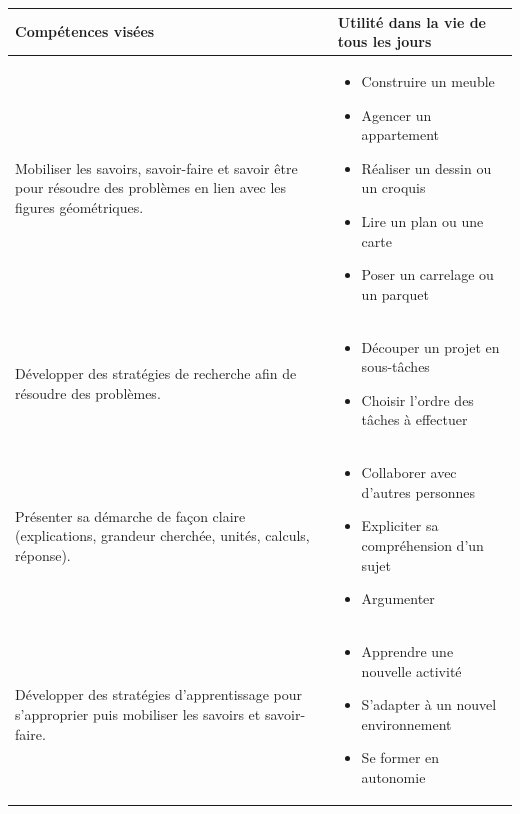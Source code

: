 \def\arraystretch{1.6}
\begin{tabularx}{\textwidth}{|>{\raggedright\arraybackslash}X|>{\raggedright\arraybackslash}X|}
\hline
\cellcolor{themeColor!30}Compétences visées & \cellcolor{themeColor!30}Utilité dans la vie de tous les jours \\
\hline
Mobiliser les savoirs, savoir-faire et savoir être pour résoudre des problèmes en lien avec les figures géométriques. 
&\vspace{-1em}
\begin{itemize}[leftmargin=*, itemsep=2pt, topsep=0pt, partopsep=0pt, parsep=0pt, label=$\triangleright$]
     \item Construire un meuble
    \item Agencer un appartement
    \item Réaliser un dessin ou un croquis
    \item Lire un plan ou une carte
    \item Poser un carrelage ou un parquet
\end{itemize} \\
\hline

Développer des stratégies de recherche afin de résoudre des problèmes.
&\vspace{-1em}
\begin{itemize}[leftmargin=*, itemsep=2pt, topsep=0pt, label=$\triangleright$]
    \item Découper un projet en sous-tâches
    \item Choisir l'ordre des tâches à effectuer
\end{itemize} \\
\hline

Présenter sa démarche de façon claire (explications, grandeur cherchée, unités, calculs, réponse).
&\vspace{-1em}
\begin{itemize}[leftmargin=*, itemsep=2pt, topsep=0pt, label=$\triangleright$]
    \item Collaborer avec d'autres personnes
    \item Expliciter sa compréhension d'un sujet
    \item Argumenter
\end{itemize} \\
\hline

Développer des stratégies d'apprentissage pour s'approprier puis mobiliser les savoirs et savoir-faire.
&\vspace{-1em}
\begin{itemize}[leftmargin=*, itemsep=2pt, topsep=0pt, label=$\triangleright$]
    \item Apprendre une nouvelle activité %
    \item S'adapter à un nouvel environnement %
    \item Se former en autonomie %
\end{itemize} \\
\hline


\end{tabularx}
